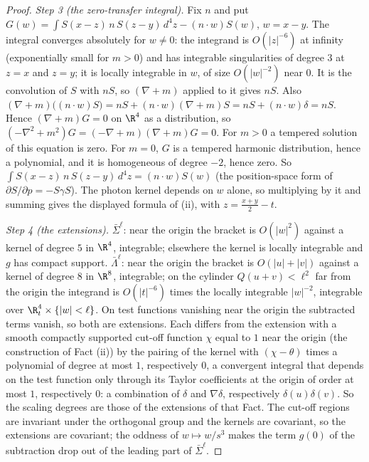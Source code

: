 \begin{proof}
\emph{Step 3 (the zero-transfer integral).} Fix $n$ and put $G(w) = \int S(x-z)\,n\,S(z-y)\,d^{4}z - (n\cdot w)S(w)$, $w = x - y$. The integral converges absolutely for $w \neq 0$: the integrand is $O(|z|^{-6})$ at infinity (exponentially small for $m > 0$) and has integrable singularities of degree $3$ at $z = x$ and $z = y$; it is locally integrable in $w$, of size $O(|w|^{-2})$ near $0$. It is the convolution of $S$ with $nS$, so $(\nabla + m)$ applied to it gives $nS$. Also $(\nabla + m)\big((n\cdot w)S\big) = nS + (n\cdot w)(\nabla + m)S = nS + (n\cdot w)\delta = nS$. Hence $(\nabla + m)G = 0$ on $\R^{4}$ as a distribution, so $(-\nabla^{2} + m^{2})G = (-\nabla + m)(\nabla + m)G = 0$. For $m > 0$ a tempered solution of this equation is zero. For $m = 0$, $G$ is a tempered harmonic distribution, hence a polynomial, and it is homogeneous of degree $-2$, hence zero. So $\int S(x-z)\,n\,S(z-y)\,d^{4}z = (n\cdot w)S(w)$ (the position-space form of $\partial S/\partial p = -S\gamma S$). The photon kernel depends on $w$ alone, so multiplying by it and summing gives the displayed formula of (ii), with $z = \frac{x+y}{2} - t$.

\emph{Step 4 (the extensions).} $\bar\Sigma^{\ell}$: near the origin the bracket is $O(|w|^{2})$ against a kernel of degree $5$ in $\R^{4}$, integrable; elsewhere the kernel is locally integrable and $g$ has compact support. $\bar\Lambda^{\ell}$: near the origin the bracket is $O(|u| + |v|)$ against a kernel of degree $8$ in $\R^{8}$, integrable; on the cylinder $Q(u+v) < \ell^{2}$ far from the origin the integrand is $O(|t|^{-6})$ times the locally integrable $|w|^{-2}$, integrable over $\R^{4}_{t}\times\{|w| < \ell\}$. On test functions vanishing near the origin the subtracted terms vanish, so both are extensions. Each differs from the extension with a smooth compactly supported cut-off function $\chi$ equal to $1$ near the origin (the construction of Fact (ii)) by the pairing of the kernel with $(\chi - \theta)$ times a polynomial of degree at most $1$, respectively $0$, a convergent integral that depends on the test function only through its Taylor coefficients at the origin of order at most $1$, respectively $0$: a combination of $\delta$ and $\nabla\delta$, respectively $\delta(u)\delta(v)$. So the scaling degrees are those of the extensions of that Fact. The cut-off regions are invariant under the orthogonal group and the kernels are covariant, so the extensions are covariant; the oddness of $w \mapsto w/s^{3}$ makes the term $g(0)$ of the subtraction drop out of the leading part of $\bar\Sigma^{\ell}$.


\end{proof}

